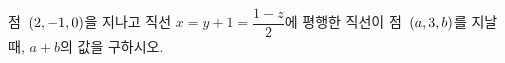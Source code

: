 점~$(2{,}\mkern3mu\mathopen{}-1{,}\mkern3mu\mathopen{}0)$을 지나고 직선 $x=y+1=\dfrac{1-z}{2}$에 평행한 직선이 점~$(a{,}\mkern3mu\mathopen{}3{,}\mkern3mu\mathopen{}b)$를 지날 때, $a+b$의 값을 구하시오.
